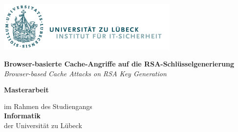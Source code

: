 \begin{titlepage}

{

\vspace*{1cm}

\includegraphics[height=2.5cm]{pictures/its-logo.png}

\vspace*{2.5cm}




\textbf{\LARGE{Browser-basierte Cache-Angriffe auf die RSA-Schlüsselgenerierung}} \vspace*{1em} \\
\textit{\LARGE{Browser-based Cache Attacks on RSA Key Generation}}

\vspace*{2em}

\textbf{Masterarbeit}

\vspace*{1em}

im Rahmen des Studiengangs \\ %
\textbf{Informatik} \\ %
der Universität zu Lübeck %

\vspace*{1.5em}

}
\end{titlepage}

